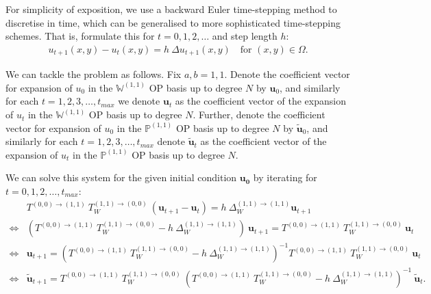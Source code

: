 \documentclass[11pt, oneside]{article}   	%
\newcommand{\Wii}{W^{(1,1)}}
\newcommand{\bigPii}{{\mathbb{P}^{(1,1)}}}
\newcommand{\laplacewii}{\Delta_W^{(1,1)\to(1,1)}}
\newcommand{\bigWii}{{\mathbb{W}^{(1,1)}}}
\begin{document}
For simplicity of exposition, we use a backward Euler time-stepping method to discretise in time, which can be generalised to more sophisticated time-stepping schemes. That is, formulate this for \(t = 0,1,2,\dots\) and step length $h$:
\begin{align}
u_{t+1}(x,y) - u_t (x,y) = h \: \Delta u_{t+1}(x,y) \quad \text{for } (x,y) \in \Omega.
\end{align}

We can tackle the problem as follows. Fix \(a, b = 1,1\). Denote the coefficient vector for expansion of $u_0$ in the $\bigWii$ OP basis up to degree $N$ by $\mathbf{u}_0$, and similarly for each $t = 1,2,3,\dots,t_{max}$ we denote $\mathbf{u}_t$ as the coefficient vector of the expansion of $u_t$ in the $\bigWii$ OP basis up to degree $N$. Further, denote the coefficient vector for expansion of $u_0$ in the $\bigPii$ OP basis up to degree $N$ by $\mathbf{\tilde{u}}_0$, and similarly for each $t = 1,2,3,\dots,t_{max}$ denote $\mathbf{\tilde{u}}_t$ as the coefficient vector of the expansion of $u_t$ in the $\bigPii$ OP basis up to degree $N$.

We can solve this system for the given initial condition $\mathbf{u_0}$ by iterating for $t = 0,1,2,\dots,t_{max}$:
\begin{align}
	&T^{(0,0)\to(1,1)} \: T_W^{(1,1)\to(0,0)} \: (\mathbf{u}_{t+1} - \mathbf{u}_t) = h \: \laplacewii \mathbf{u}_{t+1} \nonumber \\
	\iff& (T^{(0,0)\to(1,1)} \:T_W^{(1,1)\to(0,0)} - h \: \laplacewii) \: \mathbf{u}_{t+1} = T^{(0,0)\to(1,1)} \: T_W^{(1,1)\to(0,0)} \: \mathbf{u}_t \nonumber \\
	\iff& \mathbf{u}_{t+1} = (T^{(0,0)\to(1,1)} \: T_W^{(1,1)\to(0,0)} - h \: \laplacewii)^{-1} T^{(0,0)\to(1,1)} \: T_W^{(1,1)\to(0,0)} \: \mathbf{u}_t \nonumber \\
	\iff& \mathbf{\tilde{u}}_{t+1} = T^{(0,0)\to(1,1)} \: T_W^{(1,1)\to(0,0)} \: (T^{(0,0)\to(1,1)} \: T_W^{(1,1)\to(0,0)} - h \: \laplacewii)^{-1} \: \mathbf{\tilde{u}}_t.
\end{align}

\end{document}
